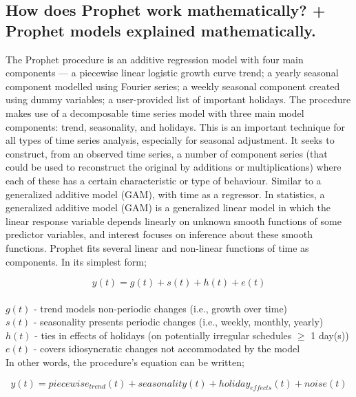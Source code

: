 \subsection{How does Prophet work mathematically? + Prophet models explained mathematically.}
The Prophet procedure is an additive regression model with four main components — a piecewise linear logistic growth curve trend; a yearly seasonal component modelled using Fourier series; a weekly seasonal component created using dummy variables; a user-provided list of important holidays. The procedure makes use of a decomposable time series model with three main model components: trend, seasonality, and holidays. This is an important technique for all types of time series analysis, especially for seasonal adjustment. It seeks to construct, from an observed time series, a number of component series (that could be used to reconstruct the original by additions or multiplications) where each of these has a certain characteristic or type of behaviour.
Similar to a generalized additive model (GAM), with time as a regressor.
In statistics, a generalized additive model (GAM) is a generalized linear model in which the linear response variable depends linearly on unknown smooth functions of some predictor variables, and interest focuses on inference about these smooth functions.
Prophet fits several linear and non-linear functions of time as components. In its simplest form;

\begin{equation}
    y(t) = g(t) + s(t) + h(t) + e(t)
\end{equation} \\ 
    
$g(t)$ - trend models non-periodic changes (i.e., growth over time) \\ 
$s(t)$ - seasonality presents periodic changes (i.e., weekly, monthly, yearly) \\ 
$h(t)$ - ties in effects of holidays (on potentially irregular schedules $\geq$ 1 day(s)) \\
$e(t)$ - covers idiosyncratic changes not accommodated by the model \\ 

In other words, the procedure’s equation can be written;

\begin{equation}
    y(t)=piecewise_{trend}(t) +seasonality(t)+holiday_{effects}(t) +noise(t)
\end{equation} \\

